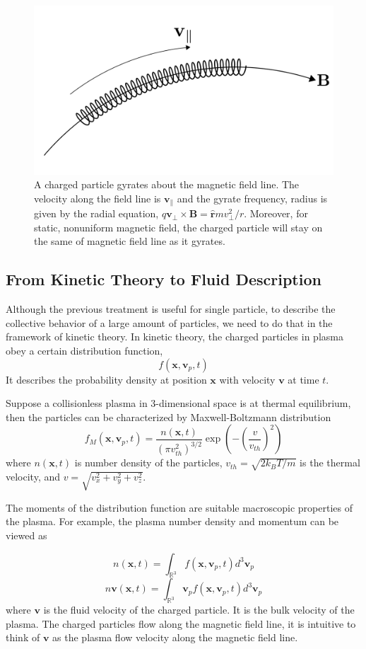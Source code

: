 \begin{figure}[htbp]
	\centering
	\includegraphics[width=0.7\linewidth]{figures/gyrate-along-b-field}
	\caption{A charged particle gyrates about the magnetic field line. The velocity along the field line is $\mathbf{v}_{\parallel}$ and the gyrate frequency, radius is given by the radial equation, $q\mathbf{v_{\perp}\times B} = \mathbf{\hat{r}} mv_\perp^2/r$. Moreover, for static, nonuniform magnetic field, the charged particle will stay on the same of magnetic field line as it gyrates.}
	\label{fig:gyrate-along-b-field}
\end{figure}

\subsection{From Kinetic Theory to Fluid Description}
Although the previous treatment is useful for single particle, to describe the collective behavior of a large amount of particles, we need to do that in the framework of kinetic theory. In kinetic theory, the charged particles in plasma obey a certain distribution function,
\[f(\mathbf{x}, \mathbf{v}_p, t)\]
It describes the probability density at position $\mathbf{x}$ with velocity $\mathbf{v}$ at time $t$.

Suppose a collisionless plasma in 3-dimensional space is at thermal equilibrium, then the particles can be characterized by Maxwell-Boltzmann distribution
\[ f_M(\mathbf{x}, \mathbf{v}_p, t) = \frac{n(\mathbf{x}, t)}{(\pi v_{th}^2)^{3/2}} \exp(-\left(\frac{v}{v_{th}}\right)^2) \]
where $n(\mathbf{x},t)$ is number density of the particles, $v_{th} = \sqrt{2k_BT/m}$ is the thermal velocity, and $v=\sqrt{v_x^2+v_y^2+v_z^2}$.

The moments of the distribution function are suitable macroscopic properties of the plasma. For example, the plasma number density and momentum can be viewed as

\[ n(\mathbf{x}, t) = \int_{\mathbb{R}^3} f(\mathbf{x}, \mathbf{v}_p, t) d^3\mathbf{v}_p \]
\[ n\mathbf{v}(\mathbf{x}, t) = \int_{\mathbb{R}^3} \mathbf{v}_p f(\mathbf{x}, \mathbf{v}_p, t) d^3\mathbf{v}_p \]
where $\mathbf{v}$ is the fluid velocity of the charged particle. It is the bulk velocity of the plasma. The charged particles flow along the magnetic field line, it is intuitive to think of $\mathbf{v}$ as the plasma flow velocity along the magnetic field line.

